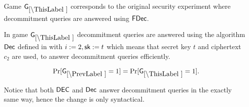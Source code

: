 Game $\games_\thisgame$ corresponds to the original security experiment where decommitment queries are answered using $\mathsf{FDec}$.

In game $\games_\thisgame$ decommitment queries are answered using the algorithm $\mathsf{Dec}$ defined in  with $i:=2, \mathsf{sk}:=t$ which means that secret key $t$ and ciphertext $c_2$ are used, to answer decommitment queries efficiently. 


\begin{lemma}\label{nitc-mh:flem}
\[
\Pr[\games_\prevgame = 1] = \Pr[\games_\thisgame = 1].
\]
\end{lemma}

Notice that both $\mathsf{DEC}$ and $\mathsf{Dec}$ answer decommitment queries in the exactly same way, hence the change is only syntactical. 


%
%
%

